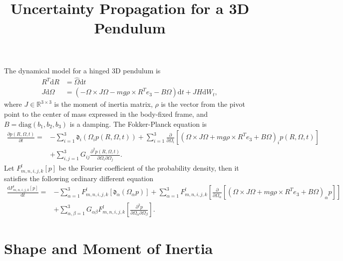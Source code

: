 \documentclass[10pt]{article}
\title{\vspace{-4ex}\textbf{Uncertainty Propagation for a 3D Pendulum\vspace{-4ex}}}
\date{}
\newcommand{\diff}[1]{\mathrm{d}#1}
\newcommand{\liediff}{\mathfrak{d}}
\newcommand{\real}{\ensuremath{\mathbb{R}}}
\newcommand{\diag}{\ensuremath{\mathrm{diag}}}
\begin{document}
\maketitle

The dynamical model for a hinged 3D pendulum is
\begin{align*}
	R^T\diff{R} &= \hat{\Omega}\diff{t} \\
	J\diff{\Omega} &= \left( -\Omega\times J\Omega - mg\rho\times R^Te_3 - B\Omega \right) \diff{t} + JH\diff{W}_t,
\end{align*}
where $J\in\real^{3\times 3}$ is the moment of inertia matrix, $\rho$ is the vector from the pivot point to the center of mass expressed in the body-fixed frame, and $B = \diag(b_1,b_2,b_3)$ is a damping.
The Fokker-Planck equation is
\begin{align} \label{eqn:FP}
	\frac{\partial p(R,\Omega,t)}{\partial t} = &-\sum_{i=1}^{3} \liediff_i (\Omega_ip(R,\Omega,t)) + \sum_{i=1}^{3} \frac{\partial}{\partial \Omega_i} \left[(\Omega\times J\Omega + mg\rho\times R^Te_3 + B\Omega)_i p(R,\Omega,t)\right] \nonumber \\ 
	&+ \sum_{i,j=1}^{3} G_{ij} \frac{\partial^2 p(R,\Omega,t)}{\partial \Omega_i \partial \Omega_j}.
\end{align}
Let $F^l_{m,n,i,j,k}[p]$ be the Fourier coefficient of the probability density, then it satisfies the following ordinary different equation
\begin{align} \label{eqn:FP Fourier}
	\frac{\diff{F^l_{m,n,i,j,k}[p]}}{\diff{t}} = &-\sum_{\alpha=1}^3 F^l_{m,n,i,j,k}[\liediff_\alpha (\Omega_\alpha p)] + \sum_{\alpha=1}^3 F^l_{m,n,i,j,k}\left[ \frac{\partial}{\partial \Omega_\alpha}[(\Omega\times J\Omega + mg\rho\times R^Te_3 + B\Omega)_\alpha p] \right] \nonumber \\
	&+ \sum_{\alpha,\beta=1}^3 G_{\alpha\beta} F^l_{m,n,i,j,k}\left[ \frac{\partial^2 p}{\partial\Omega_\alpha \partial\Omega_\beta} \right].
\end{align}

\section{Shape and Moment of Inertia}
\end{document}
